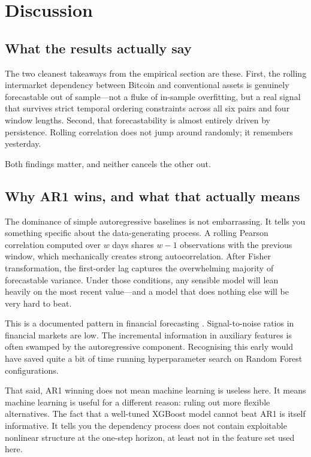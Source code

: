 \section{Discussion}
\label{sec:discussion}

\subsection{What the results actually say}

The two cleanest takeaways from the empirical section are these. First, the rolling intermarket dependency between Bitcoin and conventional assets is genuinely forecastable out of sample---not a fluke of in-sample overfitting, but a real signal that survives strict temporal ordering constraints across all six pairs and four window lengths. Second, that forecastability is almost entirely driven by persistence. Rolling correlation does not jump around randomly; it remembers yesterday.

Both findings matter, and neither cancels the other out.

\subsection{Why AR1 wins, and what that actually means}

The dominance of simple autoregressive baselines is not embarrassing. It tells you something specific about the data-generating process. A rolling Pearson correlation computed over $w$ days shares $w-1$ observations with the previous window, which mechanically creates strong autocorrelation. After Fisher transformation, the first-order lag captures the overwhelming majority of forecastable variance. Under those conditions, any sensible model will lean heavily on the most recent value---and a model that does nothing else will be very hard to beat.

This is a documented pattern in financial forecasting \cite{welch2008}. Signal-to-noise ratios in financial markets are low. The incremental information in auxiliary features is often swamped by the autoregressive component. Recognising this early would have saved quite a bit of time running hyperparameter search on Random Forest configurations.

That said, AR1 winning does not mean machine learning is useless here. It means machine learning is useful for a different reason: ruling out more flexible alternatives. The fact that a well-tuned XGBoost model cannot beat AR1 is itself informative. It tells you the dependency process does not contain exploitable nonlinear structure at the one-step horizon, at least not in the feature set used here.

